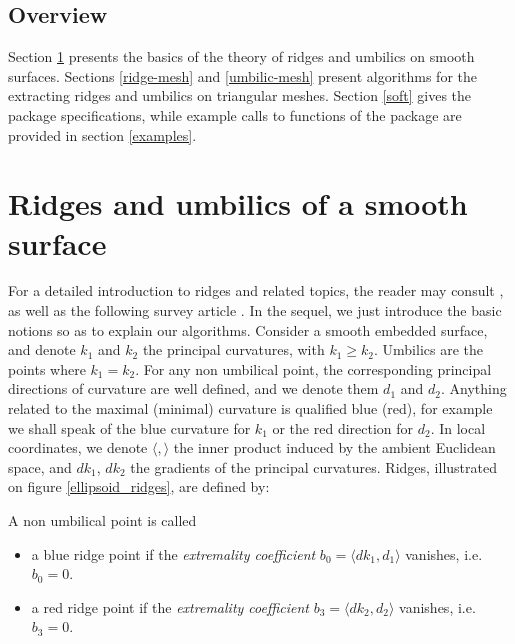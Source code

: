 \subsection{Overview}

Section \ref{smooth} presents the basics of the theory of ridges and
umbilics on smooth surfaces. Sections \ref{ridge-mesh} and
\ref{umbilic-mesh} present algorithms for the extracting ridges and
umbilics on triangular meshes. Section
\ref{soft} gives the package specifications, while example calls to
functions of the package are provided in section \ref{examples}.


\section{Ridges and umbilics of a smooth surface}
\label{smooth}


For a detailed introduction to ridges and related topics, the reader
may consult 
\cite{cgal:hgygm-ttdpf-99,cgal:p-gd-01}, as well as
the following survey article \cite{cgal:cp-dtges-05}.
In the sequel, we just introduce the basic notions so as to explain
our algorithms.  Consider a smooth embedded surface, and denote $k_1$
and $k_2$ the principal curvatures, with $k_1\geq k_2$. Umbilics are
the points where $k_1=k_2$.  For any non umbilical point, the
corresponding principal directions of curvature are well defined, and
we denote them $d_1$ and $d_2$.
Anything related to the maximal (minimal) curvature is qualified blue
(red), for example we shall speak of the blue curvature for $k_1$ or
the red direction for $d_2$.
In local coordinates, we denote $\langle , \rangle$ the inner product
induced by the ambient Euclidean space, and $dk_1$, $dk_2$ the
gradients of the principal curvatures. Ridges, illustrated on figure
\ref{ellipsoid_ridges}, are defined by:

\begin{definition}
\label{def:ridge-extrema}
A non umbilical point is called
\begin{itemize}
\item
a blue ridge point if the {\em extremality coefficient} $b_0=\langle
dk_1,d_1 \rangle$ vanishes, i.e. $b_0=0$.

\item
a red ridge point if the {\em extremality coefficient} $b_3=\langle
dk_2,d_2 \rangle$ vanishes, i.e. $b_3=0$.

\end{itemize}
\end{definition}

